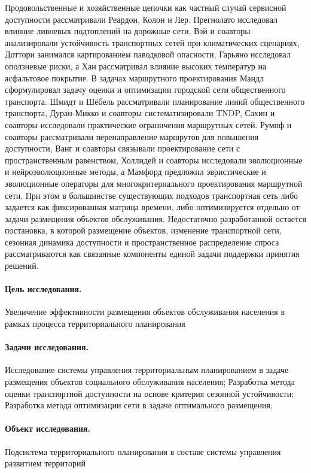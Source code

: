 Продовольственные и хозяйственные цепочки как частный случай сервисной доступности рассматривали Реардон, Колон и Лер. Прегнолато исследовал влияние ливневых подтоплений на дорожные сети, Вэй и соавторы анализировали устойчивость транспортных сетей при климатических сценариях, Доттори занимался картированием паводковой опасности, Гарьяно исследовал оползневые риски, а Хан рассматривал влияние высоких температур на асфальтовое покрытие.
В задачах маршрутного проектирования Мандл сформулировал задачу оценки и оптимизации городской сети общественного транспорта. Шмидт и Шёбель рассматривали планирование линий общественного транспорта, Дуран-Микко и соавторы систематизировали TNDP, Сахин и соавторы исследовали практические ограничения маршрутных сетей. Румпф и соавторы рассматривали перенаправление маршрутов для повышения доступности, Ванг и соавторы связывали проектирование сети с пространственным равенством, Холлидей и соавторы исследовали эволюционные и нейроэволюционные методы, а Мамфорд предложил эвристические и эволюционные операторы для многокритериального проектирования маршрутной сети.
При этом в большинстве существующих подходов транспортная сеть либо задается как фиксированная матрица времени, либо оптимизируется отдельно от задачи размещения объектов обслуживания. Недостаточно разработанной остается постановка, в которой размещение объектов, изменение транспортной сети, сезонная динамика доступности и пространственное распределение спроса рассматриваются как связанные компоненты единой задачи поддержки принятия решений.


\paragraph*{Цель исследования.}
Увеличение эффективности размещения объектов обслуживания населения в рамках процесса территориального планирования

\paragraph*{Задачи исследования.}
Исследование системы управления территориальным планированием в задаче размещения объектов социального обслуживания населения;
Разработка метода оценки транспортной доступности на основе критерия сезонной устойчивости;
Разработка метода оптимизации сети в задаче оптимального размещения;

\paragraph*{Объект исследования.}
Подсистема территориального планирования в составе системы управления развитием территорий

